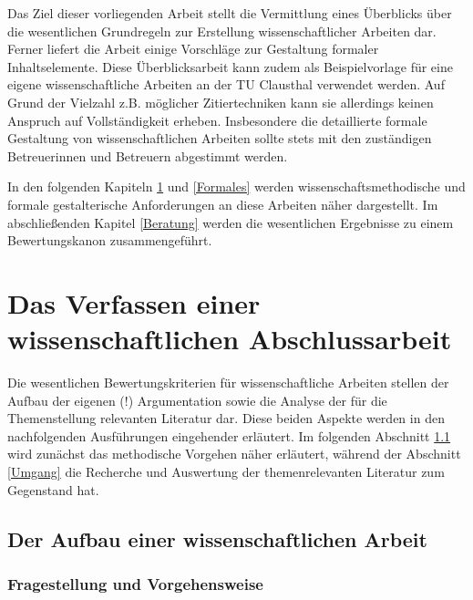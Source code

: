 \documentclass[a4paper, 12pt]{article}
\begin{document}
Das Ziel dieser vorliegenden Arbeit stellt die Vermittlung eines \"{U}berblicks \"{u}ber die
wesentlichen Grundregeln zur Erstellung wissenschaftlicher Arbeiten dar. Ferner
liefert die Arbeit einige Vorschl\"{a}ge zur Gestaltung formaler Inhaltselemente. Diese
\"{U}berblicksarbeit kann zudem als Beispielvorlage f\"{u}r eine eigene wissenschaftliche
Arbeiten an der TU Clausthal verwendet werden. Auf Grund der Vielzahl z.B. m\"{o}glicher
Zitiertechniken kann sie allerdings keinen Anspruch auf Vollst\"{a}ndigkeit erheben.
Insbesondere die detaillierte formale Gestaltung von wissenschaftlichen Arbeiten
sollte stets mit den zust\"{a}ndigen Betreuerinnen und Betreuern abgestimmt werden.

In den folgenden Kapiteln \ref{Verfassen} und \ref{Formales} werden
wissenschaftsmethodische und formale gestalterische Anforderungen an diese Arbeiten
n\"{a}her dargestellt. Im abschlie\ss enden Kapitel \ref{Beratung} werden die wesentlichen
Ergebnisse zu einem Bewertungskanon zusammengef\"{u}hrt.

\section{Das Verfassen einer wissenschaftlichen Abschlussarbeit}\label{Verfassen}

Die wesentlichen Bewertungskriterien f\"{u}r wissenschaftliche Arbeiten stellen der
Aufbau der eigenen (!) Argumentation sowie die Analyse der f\"{u}r die Themenstellung
relevanten Literatur dar. Diese beiden Aspekte werden in den nachfolgenden
Ausf\"{u}hrungen eingehender erl\"{a}utert. Im folgenden Abschnitt \ref{AAufbau} wird
zun\"{a}chst das methodische Vorgehen n\"{a}her erl\"{a}utert, w\"{a}hrend der Abschnitt
\ref{Umgang} die Recherche und Auswertung der themenrelevanten Literatur zum
Gegenstand hat.

\subsection{Der Aufbau einer wissenschaftlichen Arbeit} \label{AAufbau}
\subsubsection{Fragestellung und Vorgehensweise}
\end{document}
